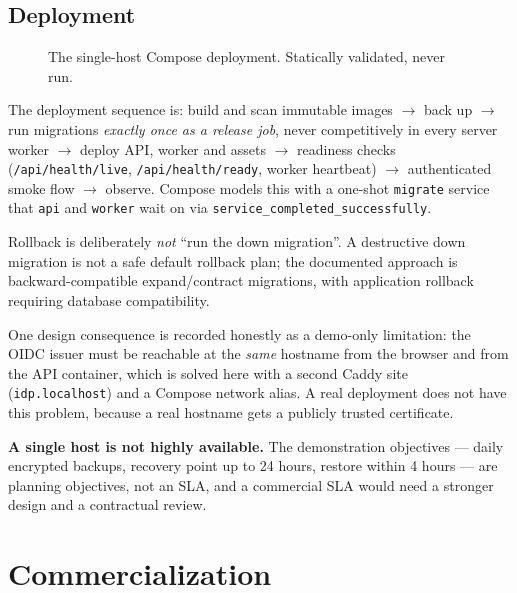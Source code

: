 \documentclass[11pt,a4paper]{article}
\begin{document}
\subsection{Deployment}

\begin{landscape}
\begin{figure}[p]
\centering
\resizebox{\linewidth}{!}{}
\caption{The single-host Compose deployment. Statically validated, never run.}
\label{fig:deploy}
\end{figure}
\end{landscape}

The deployment sequence is: build and scan immutable images $\rightarrow$ back
up $\rightarrow$ run migrations \emph{exactly once as a release job}, never
competitively in every server worker $\rightarrow$ deploy API, worker and assets
$\rightarrow$ readiness checks (\texttt{/api/health/live},
\texttt{/api/health/ready}, worker heartbeat) $\rightarrow$ authenticated smoke
flow $\rightarrow$ observe. Compose models this with a one-shot \texttt{migrate}
service that \texttt{api} and \texttt{worker} wait on via
\texttt{service\_completed\_successfully}.

Rollback is deliberately \emph{not} ``run the down migration''. A destructive
down migration is not a safe default rollback plan; the documented approach is
backward-compatible expand/contract migrations, with application rollback
requiring database compatibility.

One design consequence is recorded honestly as a demo-only limitation: the OIDC
issuer must be reachable at the \emph{same} hostname from the browser and from
the API container, which is solved here with a second Caddy site
(\texttt{idp.localhost}) and a Compose network alias. A real deployment does not
have this problem, because a real hostname gets a publicly trusted certificate.

\textbf{A single host is not highly available.} The demonstration objectives ---
daily encrypted backups, recovery point up to 24 hours, restore within 4 hours
--- are planning objectives, not an SLA, and a commercial SLA would need a
stronger design and a contractual review.

\section{Commercialization}
\label{sec:commercial}
\end{document}
